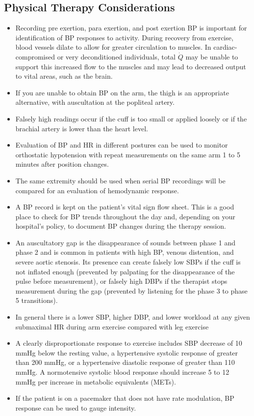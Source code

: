 \subsection{Physical Therapy Considerations}
\begin{itemize}
\item Recording pre exertion, para exertion, and post exertion BP is important for identification of BP responses to activity. During recovery from exercise, blood vessels dilate to allow for greater circulation to muscles. In cardiac-compromised or very deconditioned individuals, total $\dot{Q}$ may be unable to support this increased flow to the muscles and may lead to decreased output to vital areas, such as the brain.
\item If you are unable to obtain BP on the arm, the thigh is an appropriate alternative, with auscultation at the popliteal artery.
\item Falsely high readings occur if the cuff is too small or applied loosely or if the brachial artery is lower than the heart level.
\item Evaluation of BP and HR in different postures can be used to monitor orthostatic hypotension with repeat measurements on the same arm 1 to 5 minutes after position changes.
\item The same extremity should be used when serial BP recordings will be compared for an evaluation of hemodynamic response.
\item A BP record is kept on the patient’s vital sign flow sheet. This is a good place to check for BP trends throughout the day and, depending on your hospital’s policy, to document BP changes during the therapy session.
\item An auscultatory gap is the disappearance of sounds between phase 1 and phase 2 and is common in patients with high BP, venous distention, and severe aortic stenosis. Its presence can create falsely low SBPs if the cuff is not inflated enough (prevented by palpating for the disappearance of the pulse before measurement), or falsely high DBPs if the therapist stops measurement during the gap (prevented by listening for the phase 3 to phase 5 transitions).
\item In general there is a lower SBP, higher DBP, and lower workload at any given submaximal HR during arm exercise compared with leg exercise \cite{dias_differences_2022}
\item A clearly disproportionate response to exercise includes SBP decrease of 10 mmHg below the resting value, a hypertensive systolic response of greater than 200 mmHg, or a hypertensive diastolic response of greater than 110 mmHg. A normotensive systolic blood response should increase 5 to 12 mmHg per increase in metabolic equivalents (METs).\footnotemark{}
\item If the patient is on a pacemaker that does not have rate modulation, BP response can be used to gauge intensity. 
\end{itemize}



